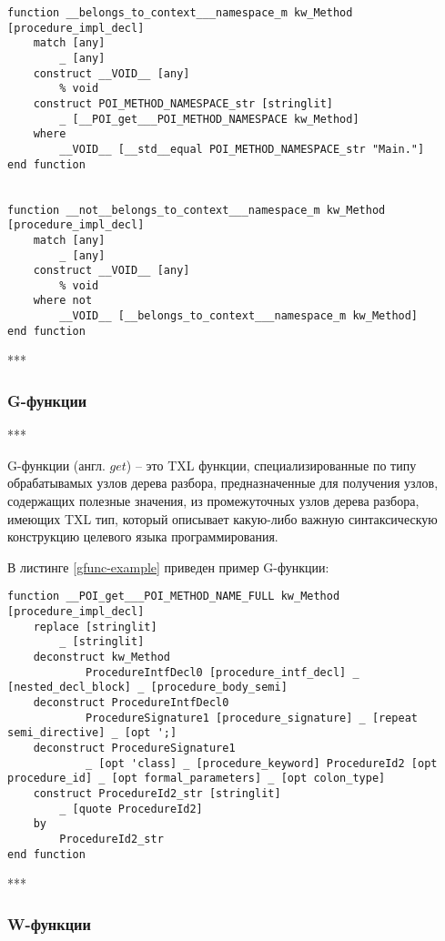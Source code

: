 \begin{lstlisting}[frame=single, language=TXL, label={hfunc-example}, caption={Пример H-функции}]
function __belongs_to_context___namespace_m kw_Method [procedure_impl_decl]
	match [any]
		_ [any]
	construct __VOID__ [any]
		% void
	construct POI_METHOD_NAMESPACE_str [stringlit]
		_ [__POI_get___POI_METHOD_NAMESPACE kw_Method]
	where
		__VOID__ [__std__equal POI_METHOD_NAMESPACE_str "Main."]
end function


function __not__belongs_to_context___namespace_m kw_Method [procedure_impl_decl]
	match [any]
		_ [any]
	construct __VOID__ [any]
		% void
	where not
		__VOID__ [__belongs_to_context___namespace_m kw_Method]
end function
\end{lstlisting}

***

\subsubsection{G-функции}

***

G-функции (англ. $get$) -- это TXL функции, специализированные по типу обрабатывамых узлов дерева разбора, предназначенные для получения узлов, содержащих полезные значения, из промежуточных узлов дерева разбора, имеющих TXL тип, который описывает какую-либо важную синтаксическую конструкцию целевого языка программирования.

В листинге \ref{gfunc-example} приведен пример G-функции:

\begin{lstlisting}[frame=single, language=TXL, label={gfunc-example}, caption={Пример G-функции}]
function __POI_get___POI_METHOD_NAME_FULL kw_Method [procedure_impl_decl]
	replace [stringlit]
		_ [stringlit]
	deconstruct kw_Method
		    ProcedureIntfDecl0 [procedure_intf_decl] _ [nested_decl_block] _ [procedure_body_semi]
	deconstruct ProcedureIntfDecl0
		    ProcedureSignature1 [procedure_signature] _ [repeat semi_directive] _ [opt ';]
	deconstruct ProcedureSignature1
		    _ [opt 'class] _ [procedure_keyword] ProcedureId2 [opt procedure_id] _ [opt formal_parameters] _ [opt colon_type]
	construct ProcedureId2_str [stringlit]
		_ [quote ProcedureId2]
	by
		ProcedureId2_str
end function
\end{lstlisting}

***

\subsubsection{W-функции}

